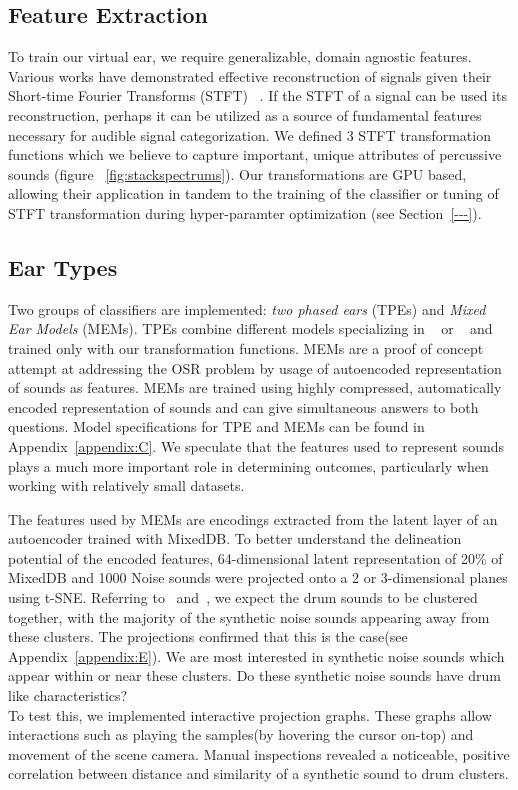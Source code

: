 \documentclass[runningheads,a4paper]{llncs}
\begin{document}
\subsection{Feature Extraction}
To train our virtual ear, we require generalizable, domain agnostic features. Various works have demonstrated effective reconstruction of signals given their Short-time Fourier Transforms (STFT) ~\cite{nawab1983signal,griffin1984signal}. If the STFT of a signal can be used its reconstruction, perhaps it can be utilized as a source of fundamental features necessary for audible signal categorization. We defined 3 STFT transformation functions which we believe to capture important, unique attributes of percussive sounds (figure ~\ref{fig:stackspectrums}). Our transformations are GPU based, allowing their application in tandem to the training of the classifier or tuning of STFT transformation during hyper-paramter optimization (see Section~\ref{---}).

\subsection{Ear Types}
\label{classifiers}
Two groups of classifiers are implemented: \emph{two phased ears} (TPEs) and \emph{Mixed Ear Models} (MEMs). TPEs combine different models specializing in ~ or ~ and trained only with our transformation functions. MEMs are a proof of concept attempt at addressing the OSR problem by usage of autoencoded representation of sounds as features. MEMs are trained using highly compressed, automatically encoded representation of sounds and can give simultaneous answers to both questions. Model specifications for TPE and MEMs can be found in Appendix~\ref{appendix:C}. We speculate that the features used to represent sounds plays a much more important role in determining outcomes, particularly when working with relatively small datasets. 

The features used by MEMs are encodings extracted from the latent layer of an autoencoder trained with MixedDB. To better understand the delineation potential of the encoded features, 64-dimensional latent representation of 20\% of MixedDB and 1000 Noise sounds were projected onto a 2 or 3-dimensional planes using t-SNE. Referring to~ and~, we expect the drum sounds to be clustered together, with the majority of the synthetic noise sounds appearing away from these clusters. The projections confirmed that this is the case(see Appendix~\ref{appendix:E}). We are most interested in synthetic noise sounds which appear within or near these clusters. Do these synthetic noise sounds have drum like characteristics?\\ 
To test this, we implemented interactive projection graphs. These graphs allow interactions such as playing the samples(by hovering the cursor on-top) and movement of the scene camera. Manual inspections revealed a noticeable, positive correlation between distance and similarity of a synthetic sound to drum clusters.
\end{document}
